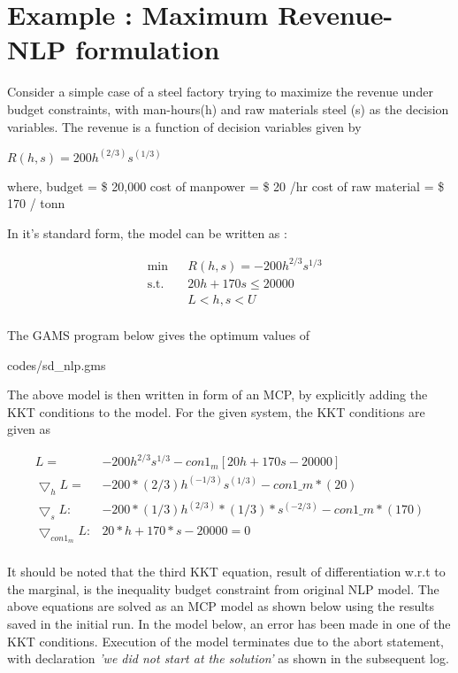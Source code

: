 \documentclass{article}
\begin{document}
\section{Example : Maximum Revenue- NLP formulation}

Consider a simple case of a steel factory trying to maximize the revenue under budget constraints, with man-hours(h) and raw materials steel (s) as the decision variables. The revenue is a function of decision variables given by

\centerline{$R(h,s) = 200 h^{(2/3)}s^{(1/3)} $ }
\bigbreak
\noindent where, budget = \$ 20,000
cost of manpower = \$ 20 /hr
cost of raw material = \$ 170 / tonn

\noindent In it's standard form, the model can be written as :

\begin{equation}
\begin{aligned}
&	\min
& & R(h,s) = - 200 h^{2/3}s^{1/3}  \\
& \text{s.t.} & & 	 20h + 170s \leq 20000 \\
& & &			L< h,s < U   \\
\end{aligned}
\end{equation}

The GAMS program below gives the optimum values of 

 {codes/sd_nlp.gms}

\noindent The above model is then written in form of an MCP, by explicitly adding the KKT conditions to the model. For the given system, the KKT conditions are given as

\begin{equation}
\begin{aligned}
 L = & - 200 h^{2/3}s^{1/3} - con1_m [ 20h + 170 s - 20000]	\\
 \bigtriangledown _h L = & - 200* (2/3) h^{(-1/3)}  s^{(1/3)} - con1\_m*(20)  	\\
 \bigtriangledown _s L:  & - 200 * (1 / 3) h^{(2/3)} *(1/3) *  s^{(-2/3)} - con1\_m*(170)   \\
 \bigtriangledown _{con1_m} L : &   20*h + 170 * s - 20000 =0 \\
\end{aligned}
\end{equation}

\noindent It should be noted that the third KKT equation, result of differentiation w.r.t to the marginal, is the inequality budget constraint from original NLP model. The above equations are solved as an MCP model as shown below using the results saved in the initial run. In the model below, an error has been made in one of the KKT conditions. Execution of the model terminates due to the abort statement, with declaration \textit{'we did not start at the solution'} as shown in the subsequent log. 
\end{document}
